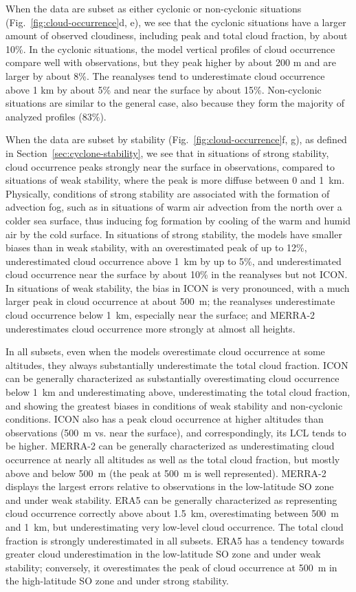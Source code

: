 \documentclass[draft]{agujournal2019}
\begin{document}
When the data are subset as either cyclonic or non-cyclonic situations (Fig.~\ref{fig:cloud-occurrence}d, e), we see that the cyclonic situations have a larger amount of observed cloudiness, including peak and total cloud fraction, by about 10\%. In the cyclonic situations, the model vertical profiles of cloud occurrence compare well with observations, but they peak higher by about 200 m and are larger by about 8\%. The reanalyses tend to underestimate cloud occurrence above 1 km by about 5\% and near the surface by about 15\%. Non-cyclonic situations are similar to the general case, also because they form the majority of analyzed profiles (83\%).

When the data are subset by stability (Fig.~\ref{fig:cloud-occurrence}f, g), as defined in Section~\ref{sec:cyclone-stability}, we see that in situations of strong stability, cloud occurrence peaks strongly near the surface in observations, compared to situations of weak stability, where the peak is more diffuse between 0 and 1~km. Physically, conditions of strong stability are associated with the formation of advection fog, such as in situations of warm air advection from the north over a colder sea surface, thus inducing fog formation by cooling of the warm and humid air by the cold surface. In situations of strong stability, the models have smaller biases than in weak stability, with an overestimated peak of up to 12\%, underestimated cloud occurrence above 1~km by up to 5\%, and underestimated cloud occurrence near the surface by about 10\% in the reanalyses but not ICON. In situations of weak stability, the bias in ICON is very pronounced, with a much larger peak in cloud occurrence at about 500~m; the reanalyses underestimate cloud occurrence below 1~km, especially near the surface; and MERRA-2 underestimates cloud occurrence more strongly at almost all heights.

In all subsets, even when the models overestimate cloud occurrence at some altitudes, they always substantially underestimate the total cloud fraction. ICON can be generally characterized as substantially overestimating cloud occurrence below 1~km and underestimating above, underestimating the total cloud fraction, and showing the greatest biases in conditions of weak stability and non-cyclonic conditions. ICON also has a peak cloud occurrence at higher altitudes than observations (500~m vs. near the surface), and correspondingly, its LCL tends to be higher. MERRA-2 can be generally characterized as underestimating cloud occurrence at nearly all altitudes as well as the total cloud fraction, but mostly above and below 500~m (the peak at 500~m is well represented). MERRA-2 displays the largest errors relative to observations in the low-latitude SO zone and under weak stability. ERA5 can be generally characterized as representing cloud occurrence correctly above about 1.5~km, overestimating between 500~m and 1~km, but underestimating very low-level cloud occurrence. The total cloud fraction is strongly underestimated in all subsets. ERA5 has a tendency towards greater cloud underestimation in the low-latitude SO zone and under weak stability; conversely, it overestimates the peak of cloud occurrence at 500~m in the high-latitude SO zone and under strong stability.
\end{document}
